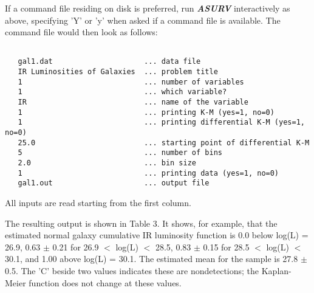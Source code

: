      If a command file residing on disk is preferred, run {\sl\bf ASURV}
interactively as above, specifying 'Y' or 'y' when asked if a command file is
available. The command file would then look as follows:
\begin{verbatim}
 
   gal1.dat                     ... data file                      
   IR Luminosities of Galaxies  ... problem title                         
   1                            ... number of variables    
   1                            ... which variable?
   IR                           ... name of the variable        
   1                            ... printing K-M (yes=1, no=0) 
   1                            ... printing differential K-M (yes=1, no=0)
   25.0                         ... starting point of differential K-M
   5                            ... number of bins
   2.0                          ... bin size
   1                            ... printing data (yes=1, no=0)
   gal1.out                     ... output file              

\end{verbatim}
All inputs are read starting from the first column.  

     The resulting output is shown in Table 3.  It shows, for example, 
that the estimated normal galaxy cumulative IR luminosity  function is 0.0
below log(L) = 26.9, 0.63 $\pm$ 0.21 for 26.9 $<$  log(L) $<$ 28.5, 
0.83 $\pm$ 0.15 for 28.5 $<$ log(L) $<$ 30.1, and 1.00 above log(L) = 30.1.
The estimated mean for the sample is 27.8 $\pm$ 0.5.  The 'C' beside two 
values indicates these are nondetections;  the Kaplan-Meier function does 
not change at these values.

\bigskip
\bigskip
{}

